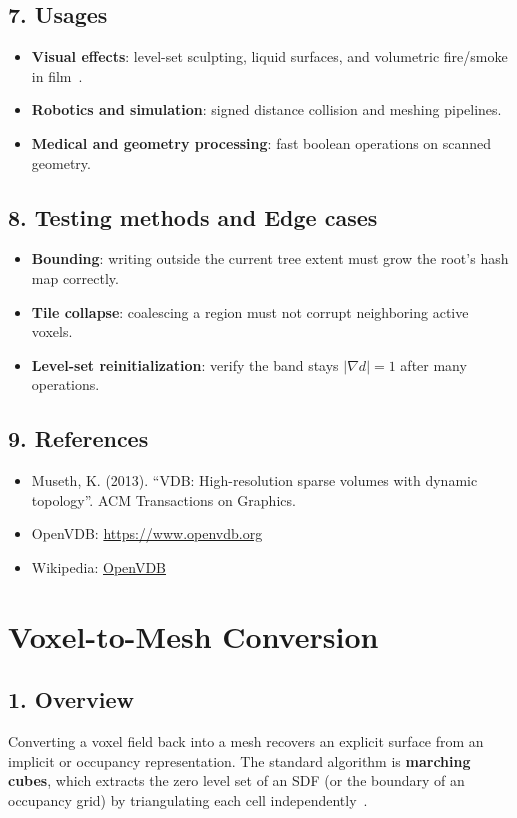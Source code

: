 \subsection{7. Usages}
\begin{itemize}
    \item \textbf{Visual effects}: level-set sculpting, liquid surfaces, and volumetric fire/smoke in film~\cite{museth2013}.
    \item \textbf{Robotics and simulation}: signed distance collision and meshing pipelines.
    \item \textbf{Medical and geometry processing}: fast boolean operations on scanned geometry.
\end{itemize}

\subsection{8. Testing methods and Edge cases}
\begin{itemize}
    \item \textbf{Bounding}: writing outside the current tree extent must grow the root's hash map correctly.
    \item \textbf{Tile collapse}: coalescing a region must not corrupt neighboring active voxels.
    \item \textbf{Level-set reinitialization}: verify the band stays $|\nabla d| = 1$ after many operations.
\end{itemize}

\subsection{9. References}
\begin{itemize}
    \item Museth, K. (2013). ``VDB: High-resolution sparse volumes with dynamic topology''. ACM Transactions on Graphics.
    \item OpenVDB: \href{https://www.openvdb.org}{https://www.openvdb.org}
    \item Wikipedia: \href{https://en.wikipedia.org/wiki/OpenVDB}{OpenVDB}
\end{itemize}

\section{Voxel-to-Mesh Conversion}
\label{sec:voxel_to_mesh}

\subsection{1. Overview}
Converting a voxel field back into a mesh recovers an explicit surface from
an implicit or occupancy representation. The standard algorithm is
\textbf{marching cubes}, which extracts the zero level
set of an SDF (or the boundary of an occupancy grid) by triangulating each
cell independently~\cite{lorensen1987}.

